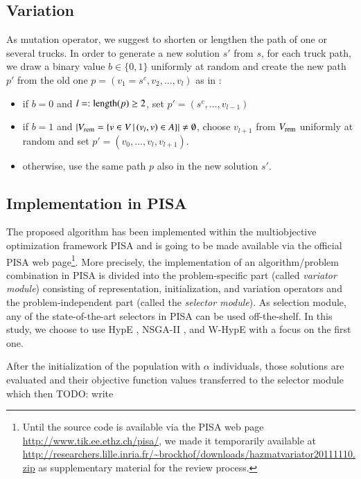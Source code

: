 \documentclass[preprint,12pt]{elsarticle}
\newcommand{\TODO}[1]{{\color{red}TODO: #1}}
\begin{document}
\subsection{Variation}\label{sec:variation}
As mutation operator, we suggest to shorten or lengthen the path of one or several trucks. In order to generate a new solution $s'$ from $s$, for each truck path, we draw a binary value $b\in\{0,1\}$ uniformly at random and create the new path $p'$ from the old one $p=(v_1=s^c,v_2,\ldots, v_l)$ as in \citep{horo2009a}:
\begin{itemize}
	\item if $b = 0$ and $l=:\textnormal{length}(p)\geq 2$, set $p' = (s^c, \ldots, v_{l-1})$	
	\item if $b = 1$ and $|V_{\textnormal{\scriptsize rem}}=\{v \in V \,|\, (v_{l}, v) \in A\}| \neq\emptyset$, choose $v_{l+1}$ from $V_{\textnormal{\scriptsize rem}}$ uniformly at random and set $p' = (v_0, \ldots, v_l, v_{l+1})$.
	\item otherwise, use the same path $p$ also in the new solution $s'$.
\end{itemize}

\subsection{Implementation in PISA}
The proposed algorithm has been implemented within the multiobjective optimization framework PISA \citep{bltz2003a} and is going to be made available via the official PISA web page\footnote{Until the source code is available via the PISA web page \url{http://www.tik.ee.ethz.ch/pisa/}, we made it temporarily available at \url{http://researchers.lille.inria.fr/~brockhof/downloads/hazmatvariator20111110.zip} as supplementary material for the review process.}. More precisely, the implementation of an algorithm/problem combination in PISA is divided into the problem-specific part (called \emph{variator module}) consisting of representation, initialization, and variation operators and the problem-independent part (called the \emph{selector module}). As selection module, any of the state-of-the-art selectors in PISA can be used off-the-shelf. In this study, we choose to use HypE \citep{bz2011a}, NSGA-II \citep{dapm2002a}, and W-HypE \citep{} with a focus on the first one.

After the initialization of the population with $\alpha$ individuals, those solutions are evaluated and their objective function values transferred to the selector module which then \TODO{write}
\end{document}
